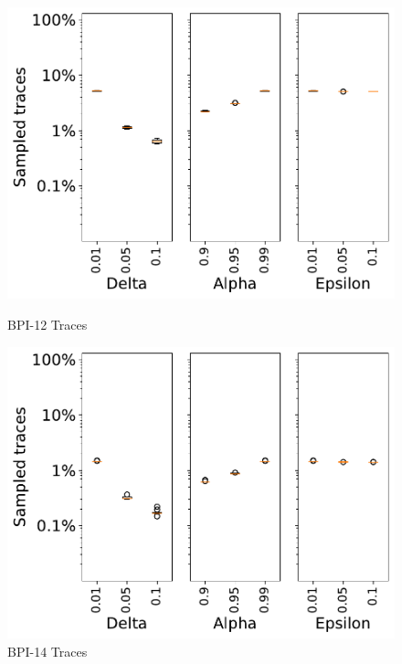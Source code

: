 \documentclass[landscape]{article}
\begin{document}
\vspace{-0.5cm}
	\begin{figure}[!htb]
	\centering
	\begin{minipage}{0.2\textwidth}
		\includegraphics[width=1.0\textwidth]{../BPI_Challenge_2012/BPI_Challenge_2012_param_traces.pdf}
		\caption{BPI-12 Traces}
	\end{minipage}
	\hfill
	\begin{minipage}{0.2\textwidth}
		\includegraphics[width=1.0\textwidth]{../Detail_Incident_Activity/Detail_Incident_Activity_param_traces.pdf}
		\caption{BPI-14 Traces}
	\end{minipage}
	\hfill
	\begin{minipage}{0.2\textwidth}

\end{minipage}
\end{figure}
\end{document}

